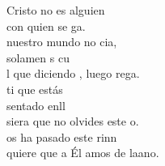 \documentclass[12pt]{article}
\begin{document}
\begin{multicols*}{2}
\begin{cancion}
	 Cristo no es alguien \\
	con quien se ga.\\
	 nuestro mundo no cia, \\
	solamen s cu  \\
	l que diciendo , luego rega.\\
	ti que estás \\
	sentado enll  \\
	siera que no olvides este o.\\
	os ha pasado  este rinn \\
	quiere que a Él amos de laano.\\
\end{cancion}%


\end{multicols*}
\end{document}
